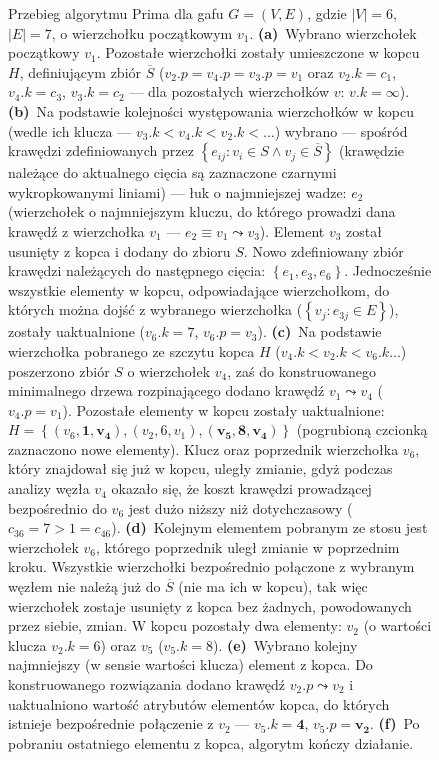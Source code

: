 \begin{figure}[!htbp]
\begin{subfigure}[b]{0.29\textwidth}
		\caption{}
		\label{fig:prime:f}
	\end{subfigure}
	\caption{
		Przebieg algorytmu Prima dla gafu $G = \left( V, E \right)$, gdzie $\left| V \right| = 6$, $\left| E \right| = 7$, o wierzchołku początkowym $v_{1}$.
		\textbf{(a)}~Wybrano wierzchołek początkowy $v_{1}$. Pozostałe wierzchołki zostały umieszczone w kopcu $H$, definiującym zbiór $\overline{S}$ ($v_{2}.p = v_{4}.p = v_{3}.p = v_{1}$ oraz $v_{2}.k = c_{1}$, $v_{4}.k = c_{3}$, $v_{3}.k = c_{2}$ --- dla pozostałych wierzchołków $v$: $v.k = \infty$).
		\textbf{(b)}~Na podstawie kolejności występowania wierzchołków w kopcu (wedle ich klucza --- $v_{3}.k < v_{4}.k < v_{2}.k < \dots$) wybrano --- spośród krawędzi zdefiniowanych przez $\left\{ e_{ij} : v_{i} \in S \wedge v_{j} \in \overline{S} \right\}$ (krawędzie należące do aktualnego cięcia są zaznaczone czarnymi wykropkowanymi liniami) --- łuk o najmniejszej wadze: $e_{2}$ (wierzchołek o najmniejszym kluczu, do którego prowadzi dana krawędź z wierzchołka $v_{1}$ --- $e_{2} \equiv v_{1} \leadsto v_{3}$). Element $v_{3}$ został usunięty z kopca i dodany do zbioru $S$. Nowo zdefiniowany zbiór krawędzi należących do następnego cięcia: $\left\{ e_{1}, e_{3}, e_{6} \right\}$. Jednocześnie wszystkie elementy w kopcu, odpowiadające wierzchołkom, do których można dojść z wybranego wierzchołka ($\left\{ v_{j} : e_{3j} \in E \right\}$), zostały uaktualnione ($v_{6}.k = 7$, $v_{6}.p = v_{3}$).
		\textbf{(c)}~Na podstawie wierzchołka pobranego ze szczytu kopca $H$ ($v_{4}.k < v_{2}.k < v_{6}.k \dots$) poszerzono zbiór $S$ o wierzchołek $v_{4}$, zaś do konstruowanego minimalnego drzewa rozpinającego dodano krawędź $v_{1} \leadsto v_{4}$ ($v_{4}.p = v_{1}$). Pozostałe elementy w kopcu zostały uaktualnione: $H = \left\{ \left( v_{6}, \textbf{1}, \textbf{v}_{\textbf{4}} \right), \left( v_{2}, 6, v_{1} \right), \left( \textbf{v}_{\textbf{5}}, \textbf{8}, \textbf{v}_{\textbf{4}} \right) \right\}$ (pogrubioną czcionką zaznaczono nowe elementy). Klucz oraz poprzednik wierzchołka $v_{6}$, który znajdował się już w kopcu, uległy zmianie, gdyż podczas analizy węzła $v_{4}$ okazało się, że koszt krawędzi prowadzącej bezpośrednio do $v_{6}$ jest dużo niższy niż dotychczasowy ($c_{36} = 7 > 1 = c_{46}$).
		\textbf{(d)}~Kolejnym elementem pobranym ze stosu jest wierzchołek $v_{6}$, którego poprzednik uległ zmianie w poprzednim kroku. Wszystkie wierzchołki bezpośrednio połączone z wybranym węzłem nie należą już do $\overline{S}$ (nie ma ich w kopcu), tak więc wierzchołek zostaje usunięty z kopca bez żadnych, powodowanych przez siebie, zmian. W kopcu pozostały dwa elementy: $v_{2}$ (o wartości klucza $v_{2}.k = 6$) oraz $v_{5}$ ($v_{5}.k = 8$).
		\textbf{(e)}~Wybrano kolejny najmniejszy (w sensie wartości klucza) element z kopca. Do konstruowanego rozwiązania dodano krawędź $v_{2}.p \leadsto v_{2}$ i uaktualniono wartość atrybutów elementów kopca, do których istnieje bezpośrednie połączenie z $v_{2}$ --- $v_{5}.k = \textbf{4}$, $v_{5}.p = \textbf{v}_{\textbf{2}}$.
		\textbf{(f)}~Po pobraniu ostatniego elementu z kopca, algorytm kończy działanie.
	}
	\label{fig:prime}
\end{figure}

